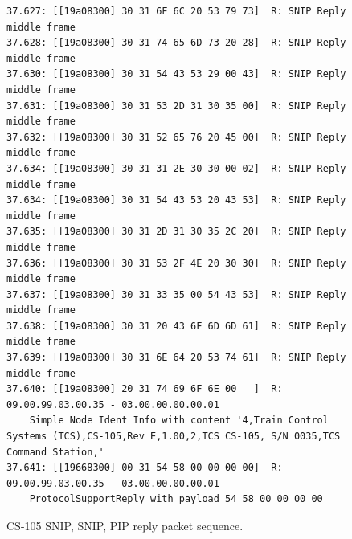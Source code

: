 \documentclass[11pt]{article}
\begin{document}
\begin{figure}[!htbp]
\begin{verbatim}
37.627: [[19a08300] 30 31 6F 6C 20 53 79 73]  R: SNIP Reply middle frame
37.628: [[19a08300] 30 31 74 65 6D 73 20 28]  R: SNIP Reply middle frame
37.630: [[19a08300] 30 31 54 43 53 29 00 43]  R: SNIP Reply middle frame
37.631: [[19a08300] 30 31 53 2D 31 30 35 00]  R: SNIP Reply middle frame
37.632: [[19a08300] 30 31 52 65 76 20 45 00]  R: SNIP Reply middle frame
37.634: [[19a08300] 30 31 31 2E 30 30 00 02]  R: SNIP Reply middle frame
37.634: [[19a08300] 30 31 54 43 53 20 43 53]  R: SNIP Reply middle frame
37.635: [[19a08300] 30 31 2D 31 30 35 2C 20]  R: SNIP Reply middle frame
37.636: [[19a08300] 30 31 53 2F 4E 20 30 30]  R: SNIP Reply middle frame
37.637: [[19a08300] 30 31 33 35 00 54 43 53]  R: SNIP Reply middle frame
37.638: [[19a08300] 30 31 20 43 6F 6D 6D 61]  R: SNIP Reply middle frame
37.639: [[19a08300] 30 31 6E 64 20 53 74 61]  R: SNIP Reply middle frame
37.640: [[19a08300] 20 31 74 69 6F 6E 00   ]  R: 09.00.99.03.00.35 - 03.00.00.00.00.01 
    Simple Node Ident Info with content '4,Train Control Systems (TCS),CS-105,Rev E,1.00,2,TCS CS-105, S/N 0035,TCS Command Station,'
37.641: [[19668300] 00 31 54 58 00 00 00 00]  R: 09.00.99.03.00.35 - 03.00.00.00.00.01 
    ProtocolSupportReply with payload 54 58 00 00 00 00
\end{verbatim}
\caption{CS-105 SNIP, SNIP, PIP reply packet sequence.}
\label{fig:CS105_SNIP2PIP_reply_sequence}
\end{figure}
\end{document}
